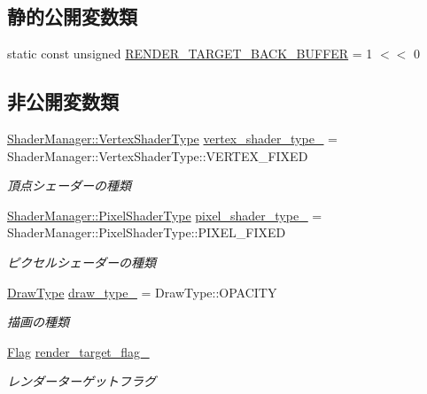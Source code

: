 \subsection*{静的公開変数類}
\begin{DoxyCompactItemize}
\item 
static const unsigned \mbox{\hyperlink{class_draw_order_list_a75498416e70da9517427695271d4b5e7}{R\+E\+N\+D\+E\+R\+\_\+\+T\+A\+R\+G\+E\+T\+\_\+\+B\+A\+C\+K\+\_\+\+B\+U\+F\+F\+ER}} = 1 $<$$<$ 0
\end{DoxyCompactItemize}
\subsection*{非公開変数類}
\begin{DoxyCompactItemize}
\item 
\mbox{\hyperlink{class_shader_manager_a9b51e49d70eb3cc58f6d1f3994e8cfbd}{Shader\+Manager\+::\+Vertex\+Shader\+Type}} \mbox{\hyperlink{class_draw_order_list_afcb0968108f4e6932358393a8bc90a8b}{vertex\+\_\+shader\+\_\+type\+\_\+}} = Shader\+Manager\+::\+Vertex\+Shader\+Type\+::\+V\+E\+R\+T\+E\+X\+\_\+\+F\+I\+X\+ED
\begin{DoxyCompactList}\small\item\em 頂点シェーダーの種類 \end{DoxyCompactList}\item 
\mbox{\hyperlink{class_shader_manager_a7d15d773b3c6a99dd7086c45c8b0be5f}{Shader\+Manager\+::\+Pixel\+Shader\+Type}} \mbox{\hyperlink{class_draw_order_list_a8c2adbcac9f724deae8da0a698e93c57}{pixel\+\_\+shader\+\_\+type\+\_\+}} = Shader\+Manager\+::\+Pixel\+Shader\+Type\+::\+P\+I\+X\+E\+L\+\_\+\+F\+I\+X\+ED
\begin{DoxyCompactList}\small\item\em ピクセルシェーダーの種類 \end{DoxyCompactList}\item 
\mbox{\hyperlink{class_draw_order_list_a6c9b9ceb312c16d399ef355f4f3486bb}{Draw\+Type}} \mbox{\hyperlink{class_draw_order_list_ad2ce43c1b177ba4dae4198aa272eeb23}{draw\+\_\+type\+\_\+}} = Draw\+Type\+::\+O\+P\+A\+C\+I\+TY
\begin{DoxyCompactList}\small\item\em 描画の種類 \end{DoxyCompactList}\item 
\mbox{\hyperlink{class_flag}{Flag}} \mbox{\hyperlink{class_draw_order_list_a8da2b635d5b2a9191088f9180d1fe6d6}{render\+\_\+target\+\_\+flag\+\_\+}}
\begin{DoxyCompactList}\small\item\em レンダーターゲットフラグ \end{DoxyCompactList}\item 

\end{DoxyCompactItemize}
